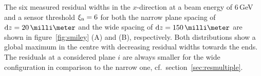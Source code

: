 The six measured residual widths in the $x$-direction at a beam energy of 6\,GeV and a sensor threshold $\xi_{\textrm{n}} = 6$ for both the narrow plane spacing of $\dz = 20\,\milli\meter$
 and the wide spacing of $\dz = 150\,\milli\meter$ are shown in figure~\ref{fig:smiley} (A) and (B), respectively. 
Both distributions show a global maximum in the centre with decreasing residual widths towards the ends. 
The residuals at a considered plane $i$ are always smaller for the wide configuration in comparison to the narrow one, cf.~section~\ref{sec:resmultiple}.


%


